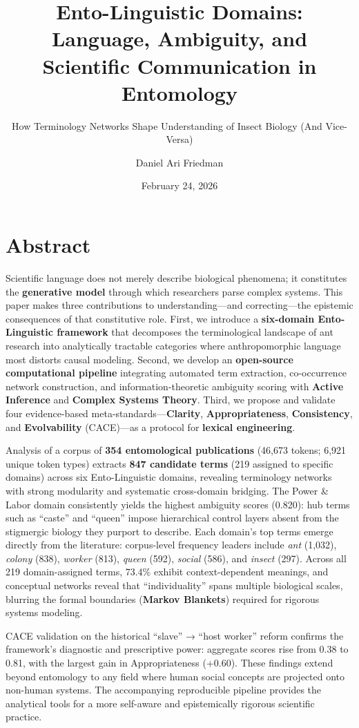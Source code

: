 \documentclass[
]{article}
\title{Ento-Linguistic Domains: Language, Ambiguity, and Scientific
Communication in Entomology}
\subtitle{How Terminology Networks Shape Understanding of Insect Biology
(And Vice-Versa)}
\author{Daniel Ari Friedman}
\date{February 24, 2026}
\numberwithin{equation}{section}
\begin{document}
\maketitle

{
\setcounter{tocdepth}{2}
\tableofcontents
}
\section{Abstract}\label{sec:abstract}

Scientific language does not merely describe biological phenomena; it
constitutes the \textbf{generative model} through which researchers
parse complex systems. This paper makes three contributions to
understanding---and correcting---the epistemic consequences of that
constitutive role. First, we introduce a \textbf{six-domain
Ento-Linguistic framework} that decomposes the terminological landscape
of ant research into analytically tractable categories where
anthropomorphic language most distorts causal modeling. Second, we
develop an \textbf{open-source computational pipeline} integrating
automated term extraction, co-occurrence network construction, and
information-theoretic ambiguity scoring with \textbf{Active Inference}
and \textbf{Complex Systems Theory}. Third, we propose and validate four
evidence-based meta-standards---\textbf{Clarity},
\textbf{Appropriateness}, \textbf{Consistency}, and
\textbf{Evolvability} (CACE)---as a protocol for \textbf{lexical
engineering}.

Analysis of a corpus of \textbf{354 entomological publications} (46,673
tokens; 6,921 unique token types) extracts \textbf{847 candidate terms}
(219 assigned to specific domains) across six Ento-Linguistic domains,
revealing terminology networks with strong modularity and systematic
cross-domain bridging. The Power \& Labor domain consistently yields the
highest ambiguity scores (0.820): hub terms such as ``caste'' and
``queen'' impose hierarchical control layers absent from the stigmergic
biology they purport to describe. Each domain's top terms emerge
directly from the literature: corpus-level frequency leaders include
\emph{ant} (1,032), \emph{colony} (838), \emph{worker} (813),
\emph{queen} (592), \emph{social} (586), and \emph{insect} (297). Across
all 219 domain-assigned terms, 73.4\% exhibit context-dependent
meanings, and conceptual networks reveal that ``individuality'' spans
multiple biological scales, blurring the formal boundaries
(\textbf{Markov Blankets}) required for rigorous systems modeling.

CACE validation on the historical ``slave'' → ``host worker'' reform
confirms the framework's diagnostic and prescriptive power: aggregate
scores rise from 0.38 to 0.81, with the largest gain in Appropriateness
(+0.60). These findings extend beyond entomology to any field where
human social concepts are projected onto non-human systems. The
accompanying reproducible pipeline provides the analytical tools for a
more self-aware and epistemically rigorous scientific practice.
\end{document}
